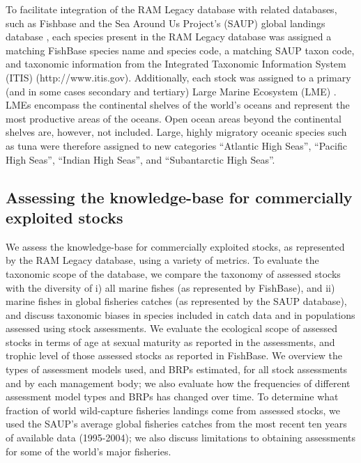 \documentclass[letterpaper,review,authoryear,12pt]{elsarticle}
\begin{document}
To facilitate integration of the RAM Legacy database with related
databases, such as Fishbase \citep{Froese:Pauly:2009:fishbase} and the
Sea Around Us Project's (SAUP) global landings database
\citep{Watson:etal:2004:fandf}, each species present in the RAM Legacy
database was assigned a matching FishBase species name and species
code, a matching SAUP taxon code, and taxonomic information from the
Integrated Taxonomic Information System (ITIS) (http://www.itis.gov).
Additionally, each stock was assigned to a primary (and in some cases
secondary and tertiary) Large Marine Ecosystem (LME)
\citep{NOAA:LME64:1998}.  LMEs encompass the continental shelves of
the world's oceans and represent the most productive areas of the
oceans.  Open ocean areas beyond the continental shelves are, however,
not included. Large, highly migratory oceanic species such as tuna
were therefore assigned to new categories ``Atlantic High Seas'',
``Pacific High Seas'', ``Indian High Seas'', and ``Subantarctic High
Seas''.

\subsection*{Assessing the knowledge-base for commercially exploited stocks}
We assess the knowledge-base for commercially exploited stocks, as
represented by the RAM Legacy database, using a variety of metrics. To
evaluate the taxonomic scope of the database, we compare the taxonomy
of assessed stocks with the diversity of i) all marine fishes (as
represented by FishBase), and ii) marine fishes in global fisheries
catches (as represented by the SAUP database), and discuss taxonomic
biases in species included in catch data and in populations assessed
using stock assessments. We evaluate the ecological scope of assessed
stocks in terms of age at sexual maturity as reported in the
assessments, and trophic level of those assessed stocks as reported in
FishBase. We overview the types of assessment models used, and BRPs
estimated, for all stock assessments and by each management body; we
also evaluate how the frequencies of different assessment model types
and BRPs has changed over time. To determine what fraction of world
wild-capture fisheries landings come from assessed stocks, we used the
SAUP's average global fisheries catches from the most recent ten years
of available data (1995-2004); we also discuss limitations to
obtaining assessments for some of the world's major fisheries.


\end{document}
